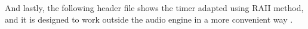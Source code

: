 And lastly, the following header file shows the timer adapted using RAII method, and it is
designed to work outside the audio engine in a more convenient way \cite{nagi2026timingcpp}.

